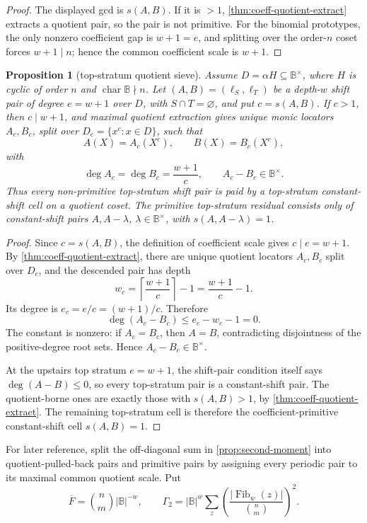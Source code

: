 \documentclass[a4paper,11pt]{amsart}
\newtheorem{proposition}[proposition]{Proposition}
\theoremstyle{remark}
\newcommand{\B}{\mathbb B}
\newcommand{\Fib}{\operatorname{Fib}}
\begin{document}
\begin{proof}
The displayed gcd is \(s(A,B)\).  If it is \(>1\), \cref{thm:coeff-quotient-extract} extracts a quotient pair, so the pair is not primitive.  For the binomial prototypes, the only nonzero coefficient gap is \(w+1=e\), and splitting over the order-\(n\) coset forces \(w+1\mid n\); hence the common coefficient scale is \(w+1\).
\end{proof}

\begin{proposition}[top-stratum quotient sieve]\label{prop:top-stratum-quotient-sieve}
Assume \(D=\alpha H\subseteq\B^\times\), where \(H\) is cyclic of order \(n\) and \(\operatorname{char}\B\nmid n\).  Let \((A,B)=(\ell_S,\ell_T)\) be a depth-\(w\) shift pair of degree \(e=w+1\) over \(D\), with \(S\cap T=\varnothing\), and put \(c=s(A,B)\).  If \(c>1\), then \(c\mid w+1\), and maximal quotient extraction gives unique monic locators \(A_c,B_c\), split over \(D_c=\{x^c:x\in D\}\), such that
\[
        A(X)=A_c(X^c),\qquad B(X)=B_c(X^c),
\]
with
\[
        \deg A_c=\deg B_c=\frac{w+1}{c},
        \qquad
        A_c-B_c\in\B^\times .
\]
Thus every non-primitive top-stratum shift pair is paid by a top-stratum constant-shift cell on a quotient coset.  The primitive top-stratum residual consists only of constant-shift pairs \(A,A-\lambda\), \(\lambda\in\B^\times\), with \(s(A,A-\lambda)=1\).
\end{proposition}

\begin{proof}
Since \(c=s(A,B)\), the definition of coefficient scale gives \(c\mid e=w+1\).  By \cref{thm:coeff-quotient-extract}, there are unique quotient locators \(A_c,B_c\) split over \(D_c\), and the descended pair has depth
\[
        w_c=\left\lceil \frac{w+1}{c}\right\rceil-1
        =\frac{w+1}{c}-1 .
\]
Its degree is \(e_c=e/c=(w+1)/c\).  Therefore
\[
        \deg(A_c-B_c)\le e_c-w_c-1=0 .
\]
The constant is nonzero: if \(A_c=B_c\), then \(A=B\), contradicting disjointness of the positive-degree root sets.  Hence \(A_c-B_c\in\B^\times\).

At the upstairs top stratum \(e=w+1\), the shift-pair condition itself says \(\deg(A-B)\le0\), so every top-stratum pair is a constant-shift pair.  The quotient-borne ones are exactly those with \(s(A,B)>1\), by \cref{thm:coeff-quotient-extract}.  The remaining top-stratum cell is therefore the coefficient-primitive constant-shift cell \(s(A,B)=1\).
\end{proof}

For later reference, split the off-diagonal sum in \cref{prop:second-moment} into quotient-pulled-back pairs and primitive pairs by assigning every periodic pair to its maximal common quotient scale.  Put
\[
        \overline F=\binom{n}{m}|\B|^{-w},
        \qquad
        \Gamma_2=|\B|^w\sum_z\left(\frac{|\Fib_w(z)|}{\binom{n}{m}}\right)^2 .
\]
\end{document}
